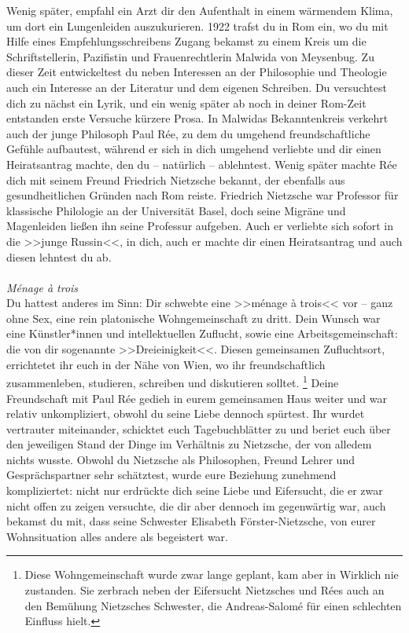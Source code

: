 \documentclass[12pt, a4paper, openany]{report}
\begin{document}
Wenig später, empfahl ein Arzt dir den Aufenthalt in einem wärmendem Klima, um dort ein Lungenleiden auszukurieren. 
1922 trafst du in Rom ein, wo du mit Hilfe eines Empfehlungsschreibens Zugang bekamst zu einem Kreis um die Schriftstellerin, Pazifistin und Frauenrechtlerin Malwida von Meysenbug.
Zu dieser Zeit entwickeltest du neben Interessen an der Philosophie und Theologie auch ein Interesse an der Literatur und dem eigenen Schreiben. 
Du versuchtest dich zu nächst ein Lyrik, und ein wenig später ab noch in deiner Rom-Zeit entstanden erste Versuche kürzere Prosa. 
In Malwidas Bekanntenkreis verkehrt auch der junge Philosoph Paul Rée, zu dem du umgehend freundschaftliche Gefühle aufbautest, während er sich in dich umgehend verliebte und dir einen Heiratsantrag machte, den du -- natürlich -- ablehntest. 
Wenig später machte Rée dich mit seinem Freund Friedrich Nietzsche bekannt, der ebenfalls aus gesundheitlichen Gründen nach Rom reiste. 
Friedrich Nietzsche war Professor für klassische Philologie an der Universität Basel, doch seine Migräne und Magenleiden ließen ihn seine Professur aufgeben. 
Auch er verliebte sich sofort in die >>junge Russin<<, in dich, auch er machte dir einen Heiratsantrag und auch diesen lehntest du ab.
\\
\\
\textit{Ménage à trois}\\
Du hattest anderes im Sinn: 
Dir schwebte eine >>ménage à trois<< vor -- ganz ohne Sex, eine rein platonische Wohngemeinschaft zu dritt.
Dein Wunsch war eine Künstler*innen und intellektuellen Zuflucht, sowie eine Arbeitsgemeinschaft: die von dir sogenannte >>Dreieinigkeit<<.
Diesen gemeinsamen Zufluchtsort, errichtetet ihr euch in der Nähe von Wien, wo ihr freundschaftlich zusammenleben, studieren, schreiben und diskutieren solltet.%
\footnote{
  Diese Wohngemeinschaft wurde zwar lange geplant, kam aber in Wirklich nie zustanden. 
  Sie zerbrach neben der Eifersucht Nietzsches und Rées auch an den Bemühung Nietzsches Schwester, die Andreas-Salomé für einen schlechten Einfluss hielt.
}
Deine Freundschaft mit Paul Rée gedieh in eurem gemeinsamen Haus weiter und war relativ unkompliziert, obwohl du seine Liebe dennoch spürtest. 
Ihr wurdet vertrauter miteinander, schicktet euch Tagebuchblätter zu und beriet euch über den jeweiligen Stand der Dinge im Verhältnis zu Nietzsche, der von alledem nichts wusste. 
Obwohl du Nietzsche als Philosophen, Freund Lehrer und Gesprächspartner sehr schätztest, wurde eure Beziehung zunehmend kompliziertet:
nicht nur erdrückte dich seine Liebe und Eifersucht, die er zwar nicht offen zu zeigen versuchte, die dir aber dennoch im gegenwärtig war, auch bekamst du mit, dass seine Schwester Elisabeth Förster-Nietzsche, von eurer Wohnsituation alles andere als begeistert war.
\end{document}

